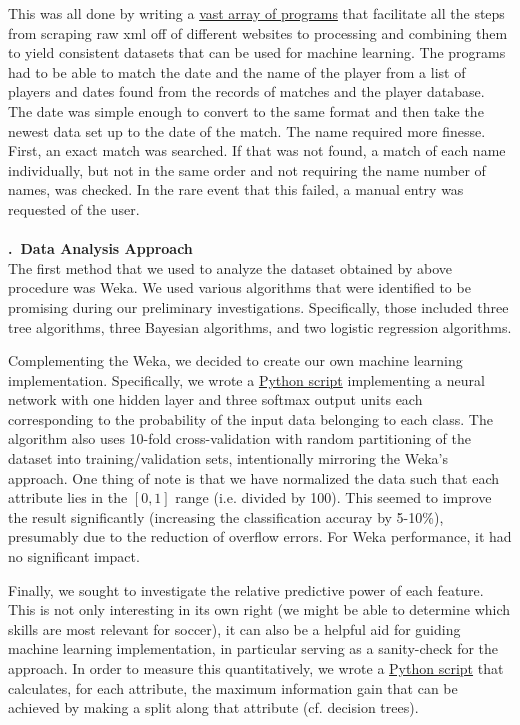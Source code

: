\documentclass[a4paper,11pt,table]{article}
\renewcommand{\section}[1]{\stepcounter{section}\noindent\textbf{\arabic{section}.~#1}\\}
\begin{document}
This was all done by writing a \href{https://github.com/TheLordBlarg/Soccer_Success/tree/master/codes/data_processing}{vast array of programs} that facilitate all the steps from scraping raw xml off of different websites to processing and combining them to yield consistent datasets that can be used for machine learning. The programs had to be able to match the date and the name of the player from a list of players and dates found from the records of matches and the player database. The date was simple enough to convert to the same format and then take the newest data set up to the date of the match. The name required more finesse. First, an exact match was searched. If that was not found, a match of each name individually, but not in the same order and not requiring the name number of names, was checked. In the rare event that this failed, a manual entry was requested of the user.\\
~\\
\section{Data Analysis Approach}
The first method that we used to analyze the dataset obtained by above procedure was Weka. We used various algorithms that were identified to be promising during our preliminary investigations. Specifically, those included three tree algorithms, three Bayesian algorithms, and two logistic regression algorithms.

Complementing the Weka, we decided to create our own machine learning implementation. Specifically, we wrote a \href{https://github.com/TheLordBlarg/Soccer_Success/blob/master/codes/machine_learning/msc_nn_hpc.py}{Python script} implementing a neural network with one hidden layer and three softmax output units each corresponding to the probability of the input data belonging to each class. The algorithm also uses 10-fold cross-validation with random partitioning of the dataset into training/validation sets, intentionally mirroring the Weka's approach. One thing of note is that we have normalized the data such that each attribute lies in the $[0,1]$ range (i.e. divided by 100). This seemed to improve the result significantly (increasing the classification accuray by 5-10\%), presumably due to the reduction of overflow errors. For Weka performance, it had no significant impact.

Finally, we sought to investigate the relative predictive power of each feature. This is not only interesting in its own right (we might be able to determine which skills are most relevant for soccer), it can also be a helpful aid for guiding machine learning implementation, in particular serving as a sanity-check for the approach. In order to measure this quantitatively, we wrote a \href{https://github.com/TheLordBlarg/Soccer_Success/blob/master/codes/feature_analysis/info_entropy.py}{Python script} that calculates, for each attribute, the maximum information gain that can be achieved by making a split along that attribute (cf. decision trees). \\
~\\
\end{document}

